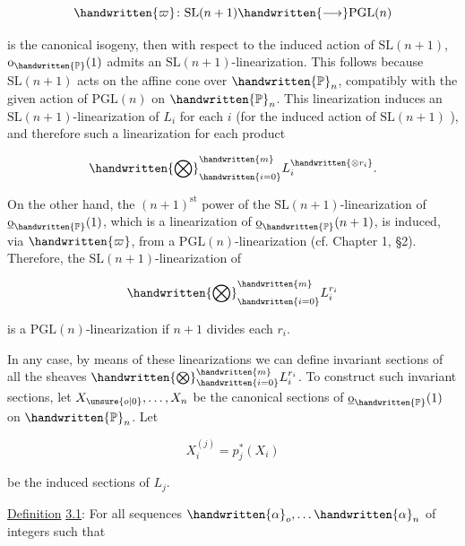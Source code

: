 

\[
\handwritten{\varpi}\colon\mathrm{SL}(n+1)\handwritten{\longrightarrow}\mathrm{PGL}(n)
\]

is the canonical isogeny, then with respect to the induced action of $\mathrm{SL}(n+1)$, $\mathrm{o}_{\handwritten{\mathbb P}}(1)$ admits an $\mathrm{SL}(n+1)$-linearization. This follows because $\mathrm{SL}(n+1)$ acts on the affine cone over $\handwritten{\mathbb P}_n$, compatibly with the given action of $\mathrm{PGL}(n)$ on $\handwritten{\mathbb P}_n$. This linearization induces an $\mathrm{SL}(n+1)$-linearization of $L_i$ for each $i$ (for the induced action of $\mathrm{SL}(n+1)$ ), and therefore such a linearization for each product

\[
\handwritten{\bigotimes}_{\handwritten{i=0}}^{\handwritten{m}} L_i^{\handwritten{\otimes r_i}}.
\]

On the other hand, the $(n+1)^{\mathrm{st}}$ power of the $\mathrm{SL}(n+1)$-linearization of $\underline{\mathrm{o}}_{\handwritten{\mathbb P}}(1)$, which is a linearization of $\underline{\mathrm{o}}_{\handwritten{\mathbb P}}(n+1)$, is induced, via $\handwritten{\varpi}$, from a $\mathrm{PGL}(n)$-linearization (cf. Chapter 1, \S2). Therefore, the $\mathrm{SL}(n+1)$-linearization of

\[
\handwritten{\bigotimes}_{\handwritten{i=0}}^{\handwritten{m}} L_i^{r_i}
\]

is a $\mathrm{PGL}(n)$-linearization if $n+1$ divides each $r_i$.

In any case, by means of these linearizations we can define invariant sections of all the sheaves $\handwritten{\bigotimes}_{\handwritten{i=0}}^{\handwritten{m}} L_i^{r_i}$. To construct such invariant sections, let $X_{\unsure{o|0}},\ldots,X_n$ be the canonical sections of $\underline{\mathrm{o}}_{\handwritten{\mathbb P}}(1)$ on $\handwritten{\mathbb P}_n$. Let

\[
X_i^{(j)}=p_j^*(X_i)
\]

be the induced sections of $L_j$.

\uline{Definition} \uline{3.1}: For all sequences $\handwritten{\alpha}_o,\ldots\handwritten{\alpha}_n$ of integers such that

